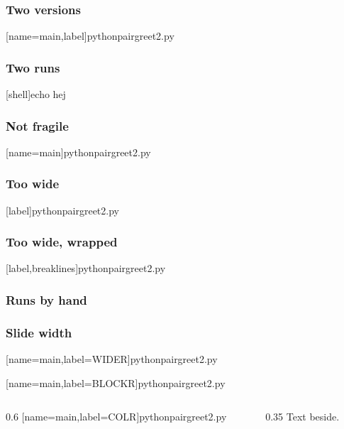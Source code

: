 \documentclass{beamer}
\begin{document}
\begin{frame}[fragile]
  \frametitle{Two versions}
    [name=main,label]{python}{pairgreet2.py}
\end{frame}
\begin{frame}[fragile]
  \frametitle{Two runs}
  [shell]{echo hej}
\end{frame}
\begin{frame}
  \frametitle{Not fragile}
  [name=main]{python}{pairgreet2.py}
\end{frame}
\begin{frame}[fragile]
  \frametitle{Too wide}
  [label]{python}{pairgreet2.py}
\end{frame}
\begin{frame}[fragile]
  \frametitle{Too wide, wrapped}
    [label,breaklines]{python}{pairgreet2.py}
\end{frame}
\begin{frame}[fragile]
  \frametitle{Runs by hand}
  
\end{frame}
\begin{frame}[fragile]
  \frametitle{Slide width}
    [name=main,label={WIDER}]{python}{pairgreet2.py}
\end{frame}
\begin{frame}[fragile]
  \begin{example}[In a block]
    [name=main,label={BLOCKR}]{python}{pairgreet2.py}
  \end{example}
\end{frame}
\begin{frame}[fragile]
  \begin{columns}
  \begin{column}{0.6\textwidth}
    [name=main,label={COLR}]{python}{pairgreet2.py}
  \end{column}
  \begin{column}{0.35\textwidth}
  Text beside.
  \end{column}
  \end{columns}
\end{frame}
\end{document}
